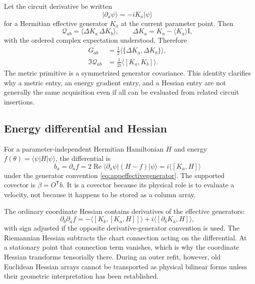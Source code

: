 \documentclass[10pt,twocolumn]{article}
\theoremstyle{definition}
\theoremstyle{remark}
\newcommand{\Id}{\mathrm I}
\newcommand{\Rea}{\operatorname{Re}}
\begin{document}
Let the circuit derivative be written
\begin{equation}
 |\partial_a\psi\rangle=-iK_a|\psi\rangle
 \label{eq:appeffectivegenerator}
\end{equation}
for a Hermitian effective generator $K_a$ at the current parameter point.
Then
\begin{equation}
 \mathcal Q_{ab}
 =\langle\Delta K_a\,\Delta K_b\rangle,\qquad
 \Delta K_a=K_a-\langle K_a\rangle\Id,
 \label{eq:appgeneratorQGT}
\end{equation}
with the ordered complex expectation understood.  Therefore
\begin{align}
 G_{ab}
 &=\frac12\langle\{\Delta K_a,\Delta K_b\}\rangle,\nonumber\\
 \Im\mathcal Q_{ab}
 &=\frac{1}{2i}\langle[K_a,K_b]\rangle .
 \label{eq:appcovariance}
\end{align}
The metric primitive is a symmetrized generator covariance.  This identity
clarifies why a metric entry, an energy gradient entry, and a Hessian entry
are not generally the same acquisition even if all can be evaluated from
related circuit insertions.

\subsection{Energy differential and Hessian}

For a parameter-independent Hermitian Hamiltonian $H$ and energy
$f(\theta)=\langle\psi|H|\psi\rangle$, the differential is
\begin{equation}
 b_a=\partial_a f
 =2\Rea\langle\partial_a\psi|(H-f)|\psi\rangle
 =i\langle[K_a,H]\rangle
 \label{eq:appgradientgenerator}
\end{equation}
under the generator convention \eqref{eq:appeffectivegenerator}.  The
supported covector is $\beta=O^{\mathsf T}b$.  It is a covector because its
physical role is to evaluate a velocity, not because it happens to be stored
as a column array.

The ordinary coordinate Hessian contains derivatives of the effective
generators:
\begin{equation}
 \partial_b\partial_a f
 =-\langle[K_b,[K_a,H]]\rangle
 +i\langle[\partial_bK_a,H]\rangle ,
 \label{eq:appcoordinatehessian}
\end{equation}
with sign adjusted if the opposite derivative-generator convention is used.
The Riemannian Hessian subtracts the chart connection acting on the
differential.  At a stationary point that connection term vanishes, which is
why the coordinate Hessian transforms tensorially there.  During an outer
refit, however, old Euclidean Hessian arrays cannot be transported as physical
bilinear forms unless their geometric interpretation has been established.
\end{document}
